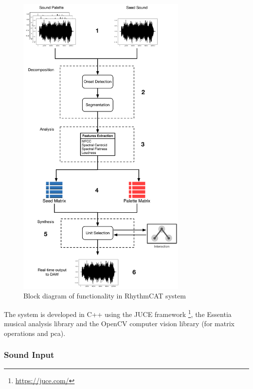 \begin{figure}
	\begin{center}
		\includegraphics[width=0.75\textwidth]{ch06_rhythmcat/figures/rhythmcat_flowchart.pdf}
	\end{center}
	\caption[Block diagram of functionality in RhythmCAT system]{Block diagram of functionality in RhythmCAT system}
	\label{fig:rhythmcat_flowchart}
\end{figure}

The system is developed in C++ using the JUCE framework \footnote{\url{https://juce.com/}}, the Essentia musical analysis library \citep{Bogdanov2013} and the OpenCV computer vision library \citep{Bradski2000} (for matrix operations and \acrshort{pca}).
 
\subsubsection{Sound Input}

